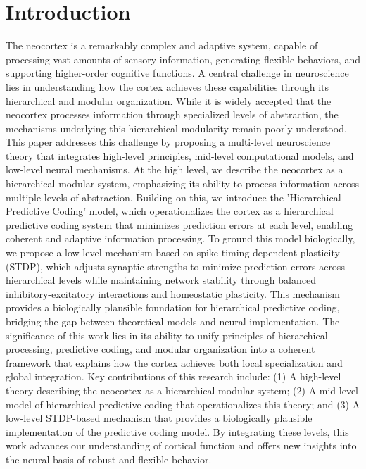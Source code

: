 \documentclass{article}
\begin{document}
\section{Introduction}
The neocortex is a remarkably complex and adaptive system, capable of processing vast amounts of sensory information, generating flexible behaviors, and supporting higher-order cognitive functions. A central challenge in neuroscience lies in understanding how the cortex achieves these capabilities through its hierarchical and modular organization. While it is widely accepted that the neocortex processes information through specialized levels of abstraction, the mechanisms underlying this hierarchical modularity remain poorly understood. This paper addresses this challenge by proposing a multi-level neuroscience theory that integrates high-level principles, mid-level computational models, and low-level neural mechanisms. At the high level, we describe the neocortex as a hierarchical modular system, emphasizing its ability to process information across multiple levels of abstraction. Building on this, we introduce the 'Hierarchical Predictive Coding' model, which operationalizes the cortex as a hierarchical predictive coding system that minimizes prediction errors at each level, enabling coherent and adaptive information processing. To ground this model biologically, we propose a low-level mechanism based on spike-timing-dependent plasticity (STDP), which adjusts synaptic strengths to minimize prediction errors across hierarchical levels while maintaining network stability through balanced inhibitory-excitatory interactions and homeostatic plasticity. This mechanism provides a biologically plausible foundation for hierarchical predictive coding, bridging the gap between theoretical models and neural implementation. The significance of this work lies in its ability to unify principles of hierarchical processing, predictive coding, and modular organization into a coherent framework that explains how the cortex achieves both local specialization and global integration. Key contributions of this research include: (1) A high-level theory describing the neocortex as a hierarchical modular system; (2) A mid-level model of hierarchical predictive coding that operationalizes this theory; and (3) A low-level STDP-based mechanism that provides a biologically plausible implementation of the predictive coding model. By integrating these levels, this work advances our understanding of cortical function and offers new insights into the neural basis of robust and flexible behavior.
\end{document}

